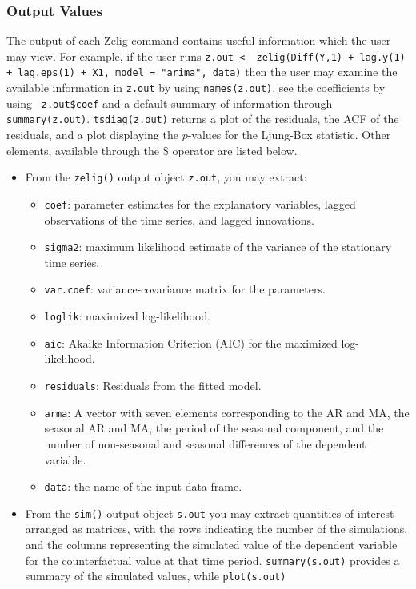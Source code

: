 \subsubsection*{Output Values}
The output of each Zelig command contains useful information which the
user may view.  For example, if the user runs {\tt z.out <-
zelig(Diff(Y,1) + lag.y(1) + lag.eps(1) + X1, model = "arima", data)}
then the user may examine the available information in {\tt z.out} by
using {\tt names(z.out)}, see the coefficients by using {\tt
z.out\$coef} and a default summary of information through {\tt
summary(z.out)}.  {\tt tsdiag(z.out)} returns a plot of the residuals,
the ACF of the residuals, and a plot displaying the $p$-values for the
Ljung-Box statistic.  Other elements, available through the \$
operator are listed below.
\begin{itemize}
\item From the {\tt zelig()} output object {\tt z.out}, you may
  extract: 
\begin{itemize}
\item {\tt coef}: parameter estimates for the explanatory variables,
lagged observations of the time series, and lagged innovations.  
\item {\tt sigma2}: maximum likelihood estimate of the variance of
the stationary time series.
\item {\tt var.coef}: variance-covariance matrix for the parameters.
\item {\tt loglik}: maximized log-likelihood.
\item {\tt aic}: Akaike Information Criterion (AIC) for the maximized
  log-likelihood.
\item {\tt residuals}: Residuals from the fitted model.
\item {\tt arma}: A vector with seven elements corresponding to the AR
and MA, the seasonal AR and MA, the period of the seasonal component,
and the number of non-seasonal and seasonal differences of the
dependent variable.
\item {\tt data}: the name of the input data frame.   
\end{itemize}
\item From the {\tt sim()} output object {\tt s.out} you may extract
  quantities of interest arranged as matrices, with the rows
  indicating the number of the simulations, and the columns
  representing the simulated value of the dependent variable for the
  counterfactual value at that time period.  {\tt summary(s.out)}
  provides a summary of the simulated values, while {\tt plot(s.out)}

\end{itemize}
